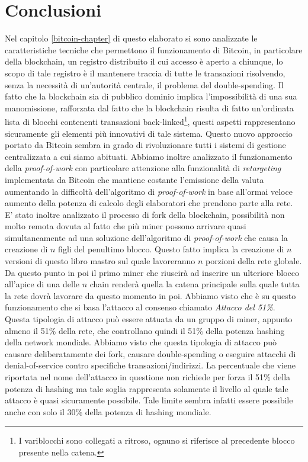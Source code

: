 
\cleardoublepage
{}

\chapter*{Conclusioni}
Nel capitolo \ref{bitcoin-chapter} di questo elaborato si sono analizzate le caratteristiche tecniche che permettono il funzionamento di Bitcoin, in particolare della blockchain, un registro distribuito il cui accesso è aperto a chiunque, lo scopo di tale registro è il mantenere traccia di tutte le transazioni risolvendo, senza la necessità di un’autorità centrale, il problema del double-spending. Il fatto che la blockchain sia di pubblico dominio implica l’impossibilità di una sua manomissione, rafforzata dal fatto che la blockchain risulta di fatto un'ordinata lista di blocchi contenenti transazioni back-linked\footnote{I variblocchi sono collegati a ritroso, ognuno si riferisce al precedente blocco presente nella catena.}, questi aspetti rappresentano sicuramente gli elementi più innovativi di tale sistema. Questo nuovo approccio portato da Bitcoin sembra in grado di rivoluzionare tutti i sistemi di gestione centralizzata a cui siamo abituati. Abbiamo inoltre analizzato il funzionamento della \textit{proof-of-work} con particolare attenzione alla funzionalità di \textit{retargeting} implementata da Bitcoin che mantiene costante l'emissione della valuta aumentando la difficoltà dell'algoritmo di \textit{proof-of-work} in base all'ormai veloce aumento della potenza di calcolo degli elaboratori che prendono parte alla rete. E' stato inoltre analizzato il processo di fork della blockchain, possibilità non molto remota dovuta al fatto che più miner possono arrivare quasi simultaneamente ad una soluzione dell'algoritmo di \textit{proof-of-work} che causa la creazione di $n$ figli del penultimo blocco. Questo fatto implica la creazione di $n$ versioni di questo libro mastro sul quale lavoreranno $n$ porzioni della rete globale. Da questo punto in poi il primo miner che riuscirà ad inserire un ulteriore blocco all'apice di una delle $n$ chain renderà quella la catena principale sulla quale tutta la rete dovrà lavorare da questo momento in poi. Abbiamo visto che è su questo funzionamento che si basa l'attacco al consenso chiamato \textit{Attacco del 51\%}. Questa tipologia di attacco può essere attuata da un gruppo di miner, appunto almeno il 51\% della rete, che controllano quindi il 51\% della potenza hashing della network mondiale. Abbiamo visto che questa tipologia di attacco può causare deliberatamente dei fork, causare double-spending o eseguire attacchi di denial-of-service contro specifiche transazioni/indirizzi. La percentuale che viene riportata nel nome dell'attacco in questione non richiede per forza il 51\% della potenza di hashing ma tale soglia rappresenta solamente il livello al quale tale attacco è quasi sicuramente possibile. Tale limite sembra infatti essere possibile anche con solo il 30\% della potenza di hashing mondiale.

